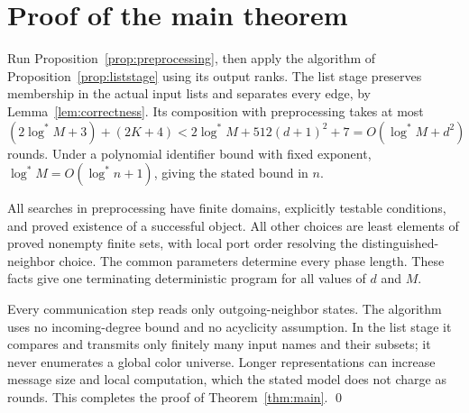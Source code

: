 \documentclass[11pt,a4paper]{article}
\numberwithin{equation}{section}
\newcommand{\logstar}{\log^{*}}
\begin{document}
\section{Proof of the main theorem}

Run Proposition~\ref{prop:preprocessing}, then apply the algorithm
of Proposition~\ref{prop:liststage} using its output ranks.
The list stage preserves membership in the actual input lists
and separates every edge, by Lemma~\ref{lem:correctness}.
Its composition with preprocessing takes at most
\[
 (2\logstar M+3)+(2K+4)
 <2\logstar M+512(d+1)^2+7
 =O(\logstar M+d^2)
\]
rounds. Under a polynomial identifier bound with fixed exponent,
\(\logstar M=O(\logstar n+1)\), giving the stated bound in \(n\).

All searches in preprocessing have finite domains, explicitly
testable conditions, and proved existence of a successful object.
All other choices are least elements of proved nonempty finite
sets, with local port order resolving the distinguished-neighbor
choice. The common parameters determine every phase length.
These facts give one terminating deterministic program for all
values of \(d\) and \(M\).

Every communication step reads only outgoing-neighbor states.
The algorithm uses no incoming-degree bound and no acyclicity
assumption. In the list stage it compares and transmits only
finitely many input names and their subsets; it never enumerates
a global color universe. Longer representations can increase
message size and local computation, which the stated model does
not charge as rounds. This completes the proof of
Theorem~\ref{thm:main}.
\qed
\end{document}
